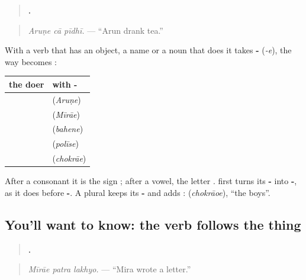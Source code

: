 \begin{grammarlens}[title={Grammar Lens: the doer takes -\gu{એ}}]
\begin{quote}
\textbf{  .}
\end{quote}

\begin{quote}
\emph{Aruṇe cā pīdhī.} — \textquotedblleft{}Arun drank tea.\textquotedblright{}
\end{quote}

With a verb that has an object, a name or a noun that does it takes \textbf{-} (\emph{-e}), the way \textbf{} becomes \textbf{}:

\noindent
\begin{tabularx}{\linewidth}{@{}>{\raggedright\arraybackslash}X>{\raggedright\arraybackslash}X@{}}
\toprule
\textbf{the doer} & \textbf{with -\gu{એ}} \\
\midrule
\textbf{\gu{અરુણ}} & \textbf{\gu{અરુણે}} (\emph{Aruṇe}) \\
\textbf{\gu{મીરા}} & \textbf{\gu{મીરાએ}} (\emph{Mīrāe}) \\
\textbf{\gu{બહેન}} & \textbf{\gu{બહેને}} (\emph{bahene}) \\
\textbf{\gu{પોલીસ}} & \textbf{\gu{પોલીસે}} (\emph{polīse}) \\
\textbf{\gu{છોકરો}} & \textbf{\gu{છોકરાએ}} (\emph{chokrāe}) \\
\bottomrule
\end{tabularx}

After a consonant it is the sign \textbf{}; after a vowel, the letter \textbf{}. \textbf{} first turns its \textbf{-} into \textbf{-}, as it does before \textbf{-}. A plural keeps its \textbf{-} and adds \textbf{}: \textbf{} (\emph{chokrāoe}), \textquotedblleft{}the boys\textquotedblright{}.
\end{grammarlens}

\subsection*{You'll want to know: the verb follows the thing}
\begin{quote}
\textbf{  .}
\end{quote}

\begin{quote}
\emph{Mīrāe patra lakhyo.} — \textquotedblleft{}Mira wrote a letter.\textquotedblright{}
\end{quote}

